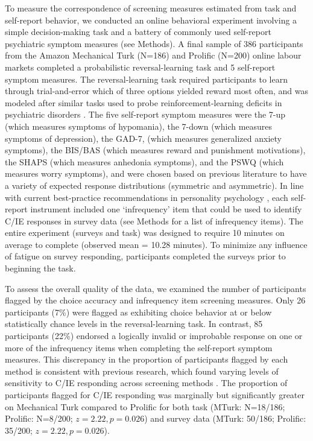 \documentclass[a4paper,notitlepage,12pt]{article}
\begin{document}
\begin{refsection}[main]
To measure the correspondence of screening measures estimated from task and self-report behavior, we conducted an online behavioral experiment involving a simple decision-making task and a battery of commonly used self-report psychiatric symptom measures (see Methods). A final sample of 386 participants from the Amazon Mechanical Turk (N=186) and Prolific (N=200) online labour markets completed a probabilistic reversal-learning task and 5 self-report symptom measures. The reversal-learning task required participants to learn through trial-and-error which of three options yielded reward most often, and was modeled after similar tasks used to probe reinforcement-learning deficits in psychiatric disorders \cite{waltz2007probabilistic, mukherjee_reward_2020}. The five self-report symptom measures were the 7-up (which measures symptoms of hypomania), the 7-down (which measures symptoms of depression), the GAD-7, (which measures generalized anxiety symptoms), the BIS/BAS (which measures reward and punishment motivations), the SHAPS (which measures anhedonia symptoms), and the PSWQ (which measures worry symptoms), and were chosen based on previous literature to have a variety of expected response distributions (symmetric and asymmetric). In line with current best-practice recommendations in personality psychology \cite{huang2015detecting}, each self-report instrument included one `infrequency' item that could be used to identify C/IE responses in survey data (see Methods for a list of infrequency items). The entire experiment (surveys and task) was designed to require 10 minutes on average to complete (observed mean = 10.28 minutes). To minimize any influence of fatigue on survey responding, participants completed the surveys prior to beginning the task.

To assess the overall quality of the data, we examined the number of participants flagged by the choice accuracy and infrequency item screening measures. Only 26 participants (7\%) were flagged as exhibiting choice behavior at or below statistically chance levels in the reversal-learning task. In contrast, 85 participants (22\%) endorsed a logically invalid or improbable response on one or more of the infrequency items when completing the self-report symptom measures. This discrepancy in the proportion of participants flagged by each method is consistent with previous research, which found varying levels of sensitivity to C/IE responding across screening methods \cite{desimone2018dirty}. The proportion of participants flagged for C/IE responding was marginally but significantly greater on Mechanical Turk compared to Prolific for both task (MTurk: N=18/186; Prolific: N=8/200; $z=2.22, p=0.026$) and survey data (MTurk: 50/186; Prolific: 35/200; $z = 2.22, p = 0.026$).


\end{refsection}
\end{document}
